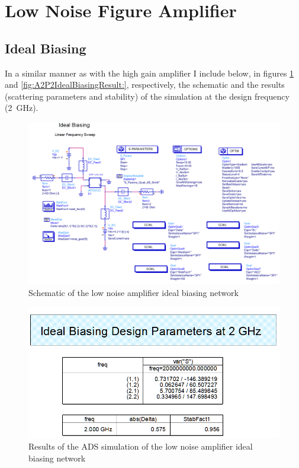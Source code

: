 \section{Low Noise Figure Amplifier}

\subsection{Ideal Biasing}

In a similar manner as with the high gain amplifier I include below, in figures
\ref{fig:A2P2IdealSchematic} and \ref{fig:A2P2IdealBiasingResult:},
respectively, the schematic and the results (scattering parameters and
stability) of the simulation at the design frequency (\SI{2}{\giga\hertz}).

\begin{figure}[H]
    \centering
    \includegraphics[width=0.8\linewidth]{Images/A2P2IdealSchematic.png}
    \caption{Schematic of the low noise amplifier ideal biasing network}
    \label{fig:A2P2IdealSchematic}
\end{figure}

\begin{figure}[H]
    \centering
    \includegraphics[width=0.8\linewidth]{Images/A2P2IdealBiasingResults.png}
    \caption{Results of the ADS simulation of the low noise amplifier ideal biasing network}
    \label{fig:A2P2IdealBiasingResults}
\end{figure}

